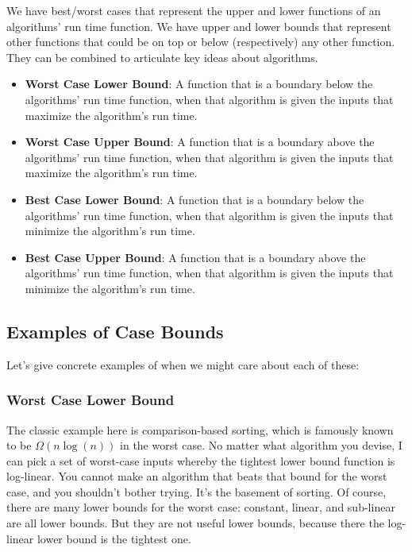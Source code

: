 \documentclass[en,hazy,blue,screen,14pt]{elegantnote}
\begin{document}
We have best/worst cases that represent the upper and lower functions
of an algorithms' run time function. We have upper and lower bounds
that represent other functions that could be on top or below (respectively)
any other function. They can be combined to articulate key ideas about
algorithms.
\begin{itemize}
\item \textbf{Worst Case Lower Bound}: A function that is a boundary below
the algorithms' run time function, when that algorithm is given the
inputs that maximize the algorithm's run time.
\item \textbf{Worst Case Upper Bound}: A function that is a boundary above
the algorithms' run time function, when that algorithm is given the
inputs that maximize the algorithm's run time.
\item \textbf{Best Case Lower Bound}: A function that is a boundary below
the algorithms' run time function, when that algorithm is given the
inputs that minimize the algorithm's run time.
\item \textbf{Best Case Upper Bound}: A function that is a boundary above
the algorithms' run time function, when that algorithm is given the
inputs that minimize the algorithm's run time.
\end{itemize}

\subsection{Examples of Case Bounds}

Let's give concrete examples of when we might care about each of these:

\subsubsection*{Worst Case Lower Bound}

The classic example here is comparison-based sorting, which is famously
known to be $\Omega(n\log(n))$ in the worst case. No matter what
algorithm you devise, I can pick a set of worst-case inputs whereby
the tightest lower bound function is log-linear. You cannot make an
algorithm that beats that bound for the worst case, and you shouldn't
bother trying. It's the basement of sorting. Of course, there are
many lower bounds for the worst case: constant, linear, and sub-linear
are all lower bounds. But they are not useful lower bounds, because
there the log-linear lower bound is the tightest one.
\end{document}
